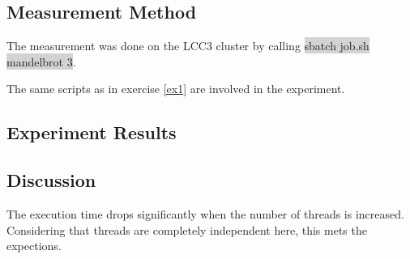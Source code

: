 \documentclass[parskip]{scrartcl}
\begin{document}
	\subsection{Measurement Method}
	The measurement was done on the LCC3 cluster by calling \colorbox{lightgray}{sbatch job.sh mandelbrot 3}.
	
	The same scripts as in exercise \ref{ex1} are involved in the experiment.
	
	\subsection{Experiment Results}
	
	\subsection{Discussion}
	The execution time drops significantly when the number of threads is increased. Considering that threads are completely independent here, this mets the expections.
\end{document}
